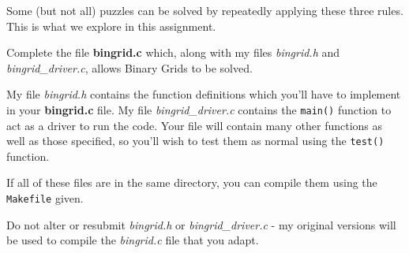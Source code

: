 \noindent Some (but not all) puzzles can be solved by repeatedly applying these three rules.
This is what we explore in this assignment.

\begin{exercise}

Complete the file {\bf bingrid.c} which, along with my files {\em
bingrid.h} and {\em bingrid\_driver.c}, allows Binary Grids to be solved.

\noindent My file {\em bingrid.h} contains the function definitions
which you'll have to implement in your {\bf bingrid.c} file.  My file
{\em bingrid\_driver.c} contains the \verb^main()^ function to act as
a driver to run the code.  Your file will contain many other functions
as well as those specified, so you'll wish to test them as normal using
the \verb^test()^ function.

\noindent If all of these files are in the same directory, you can
compile them using the \verb^Makefile^ given.

\noindent Do not alter or resubmit {\em bingrid.h} or {\em
bingrid\_driver.c} - my original versions will be used to compile the
{\em bingrid.c} file that you adapt.

\end{exercise}
